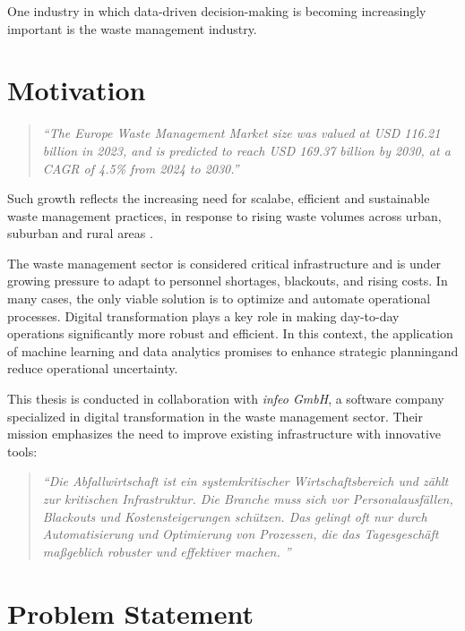 \documentclass[a4paper,12pt,twoside]{scrreprt}
\begin{document}
One industry in which data-driven decision-making is becoming increasingly
important is the
waste management industry.

\section{Motivation}
\begin{quote}
  \textit{
    ``The Europe Waste Management Market size was valued at USD 116.21
    billion in
    2023, and is predicted to reach USD 169.37 billion by 2030, at a CAGR of
    4.5\% from 2024 to 2030.''\cite{noauthor_europe_nodate}}
\end{quote}

Such growth reflects the increasing need for scalabe, efficient and sustainable
waste
management practices, in response to rising waste volumes across urban,
suburban and rural areas \cite{noauthor_solid_nodate}.

The waste management sector is considered critical infrastructure and is under
growing pressure to adapt to personnel shortages, blackouts, and rising costs.
In many cases, the only viable solution is to optimize and automate operational
processes. Digital transformation plays a key role in making day-to-day
operations significantly more robust and
efficient.\cite{noauthor_gemeinsam_nodate}
In this context, the application of machine learning and data analytics
promises to enhance strategic planningand reduce operational uncertainty.

This thesis is conducted in collaboration with \textit{infeo GmbH}, a software
company specialized in digital transformation in the waste management
sector. Their mission emphasizes the need to improve existing infrastructure
with innovative tools:

\begin{quotation}
  \textit{
    ``Die Abfallwirtschaft ist ein systemkritischer Wirtschaftsbereich und
    zählt
    zur kritischen Infrastruktur. Die Branche muss sich vor Personalausfällen,
    Blackouts und Kostensteigerungen schützen. Das gelingt oft nur durch
    Automatisierung und Optimierung von Prozessen, die das Tagesgeschäft
    maßgeblich robuster und effektiver machen.
    ''\cite{noauthor_gemeinsam_nodate}}
\end{quotation}

\section{Problem Statement}
\end{document}
